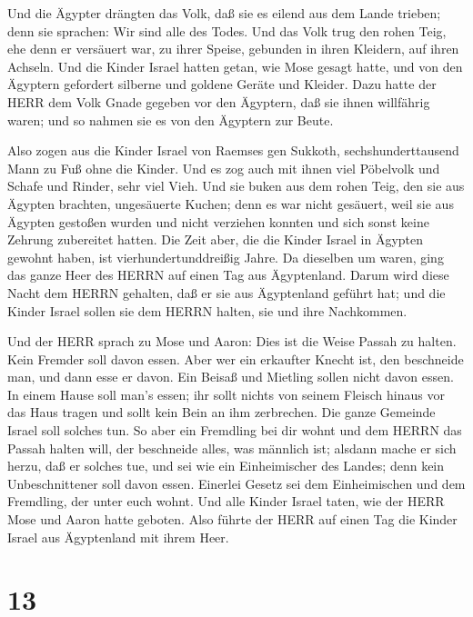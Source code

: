  Und die Ägypter drängten das Volk, daß sie es eilend aus
dem Lande trieben; denn sie sprachen: Wir sind alle des Todes.
 Und das Volk trug den rohen Teig, ehe denn er versäuert
war, zu ihrer Speise, gebunden in ihren Kleidern, auf ihren Achseln.
 Und die Kinder Israel hatten getan, wie Mose gesagt hatte,
und von den Ägyptern gefordert silberne und goldene Geräte und Kleider.
 Dazu hatte der HERR dem Volk Gnade gegeben vor den
Ägyptern, daß sie ihnen willfährig waren; und so nahmen sie es von den
Ägyptern zur Beute.

 Also zogen aus die Kinder Israel von Raemses gen Sukkoth,
sechshunderttausend Mann zu Fuß ohne die Kinder.  Und es
zog auch mit ihnen viel Pöbelvolk und Schafe und Rinder, sehr viel Vieh.
 Und sie buken aus dem rohen Teig, den sie aus Ägypten
brachten, ungesäuerte Kuchen; denn es war nicht gesäuert, weil sie aus
Ägypten gestoßen wurden und nicht verziehen konnten und sich sonst keine
Zehrung zubereitet hatten.  Die Zeit aber, die die Kinder
Israel in Ägypten gewohnt haben, ist vierhundertunddreißig Jahre.
 Da dieselben um waren, ging das ganze Heer des HERRN auf
einen Tag aus Ägyptenland.  Darum wird diese Nacht dem
HERRN gehalten, daß er sie aus Ägyptenland geführt hat; und die Kinder
Israel sollen sie dem HERRN halten, sie und ihre Nachkommen.

 Und der HERR sprach zu Mose und Aaron: Dies ist die Weise
Passah zu halten. Kein Fremder soll davon essen.  Aber wer
ein erkaufter Knecht ist, den beschneide man, und dann esse er davon.
 Ein Beisaß und Mietling sollen nicht davon essen.
 In einem Hause soll man's essen; ihr sollt nichts von
seinem Fleisch hinaus vor das Haus tragen und sollt kein Bein an ihm
zerbrechen.  Die ganze Gemeinde Israel soll solches tun.
 So aber ein Fremdling bei dir wohnt und dem HERRN das
Passah halten will, der beschneide alles, was männlich ist; alsdann
mache er sich herzu, daß er solches tue, und sei wie ein Einheimischer
des Landes; denn kein Unbeschnittener soll davon essen. 
Einerlei Gesetz sei dem Einheimischen und dem Fremdling, der unter euch
wohnt.  Und alle Kinder Israel taten, wie der HERR Mose und
Aaron hatte geboten.  Also führte der HERR auf einen Tag
die Kinder Israel aus Ägyptenland mit ihrem Heer.

\hypertarget{section-12}{%
\section{13}\label{section-12}}

